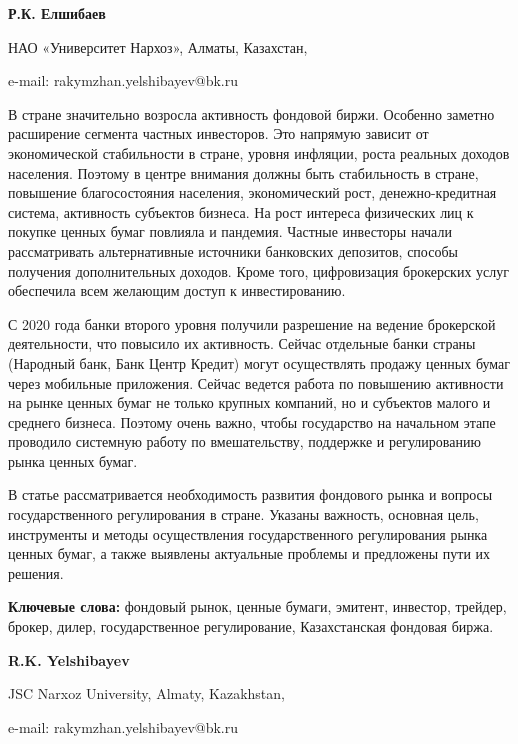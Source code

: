 \begin{center}
{\bfseries Р.К. Елшибаев}

НАО «Университет Нархоз», Алматы, Казахстан,

e-mail: rakymzhan.yelshibayev@bk.ru
\end{center}

В стране значительно возросла активность фондовой биржи. Особенно
заметно расширение сегмента частных инвесторов. Это напрямую зависит от
экономической стабильности в стране, уровня инфляции, роста реальных
доходов населения. Поэтому в центре внимания должны быть стабильность в
стране, повышение благосостояния населения, экономический рост,
денежно-кредитная система, активность субъектов бизнеса. На рост
интереса физических лиц к покупке ценных бумаг повлияла и пандемия.
Частные инвесторы начали рассматривать альтернативные источники
банковских депозитов, способы получения дополнительных доходов. Кроме
того, цифровизация брокерских услуг обеспечила всем желающим доступ к
инвестированию.

С 2020 года банки второго уровня получили разрешение на ведение
брокерской деятельности, что повысило их активность. Сейчас отдельные
банки страны (Народный банк, Банк Центр Кредит) могут осуществлять
продажу ценных бумаг через мобильные приложения. Сейчас ведется работа
по повышению активности на рынке ценных бумаг не только крупных
компаний, но и субъектов малого и среднего бизнеса. Поэтому очень важно,
чтобы государство на начальном этапе проводило системную работу по
вмешательству, поддержке и регулированию рынка ценных бумаг.

В статье рассматривается необходимость развития фондового рынка и
вопросы государственного регулирования в стране. Указаны важность,
основная цель, инструменты и методы осуществления государственного
регулирования рынка ценных бумаг, а также выявлены актуальные проблемы и
предложены пути их решения.

{\bfseries Ключевые слова:} фондовый рынок, ценные бумаги, эмитент,
инвестор, трейдер, брокер, дилер, государственное регулирование,
Казахстанская фондовая биржа.


\begin{center}
{\bfseries R.K. Yelshibayev}

JSC Narxoz University, Almaty, Kazakhstan,

e-mail: rakymzhan.yelshibayev@bk.ru
\end{center}

